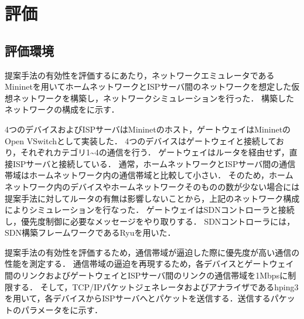 \documentclass[a4paper,11pt,uplatex]{ujreport}
\begin{document}

\chapter{評価}
\label{chap:評価}

\section{評価環境}
\label{評価環境}

  提案手法の有効性を評価するにあたり，ネットワークエミュレータであるMininetを用いてホームネットワークとISPサーバ間のネットワークを想定した仮想ネットワークを構築し，ネットワークシミュレーションを行った．
  構築したネットワークの構成をに示す．\par


  4つのデバイスおよびISPサーバはMininetのホスト，ゲートウェイはMininetのOpen VSwitchとして実装した．
  4つのデバイスはゲートウェイと接続しており，それぞれカテゴリ1\textasciitilde4の通信を行う．
  ゲートウェイはルータを経由せず，直接ISPサーバと接続している．
  通常，ホームネットワークとISPサーバ間の通信帯域はホームネットワーク内の通信帯域と比較して小さい．
  そのため，ホームネットワーク内のデバイスやホームネットワークそのものの数が少ない場合には提案手法に対してルータの有無は影響しないことから，上記のネットワーク構成によりシミュレーションを行なった．
  ゲートウェイはSDNコントローラと接続し，優先度制御に必要なメッセージをやり取りする．
  SDNコントローラには，SDN構築フレームワークであるRyuを用いた．\par

  提案手法の有効性を評価するため，通信帯域が逼迫した際に優先度が高い通信の性能を測定する．
  通信帯域の逼迫を再現するため，各デバイスとゲートウェイ間のリンクおよびゲートウェイとISPサーバ間のリンクの通信帯域を1Mbpsに制限する．
  そして，TCP/IPパケットジェネレータおよびアナライザであるhping3を用いて，各デバイスからISPサーバへとパケットを送信する．送信するパケットのパラメータをに示す．
\end{document}
